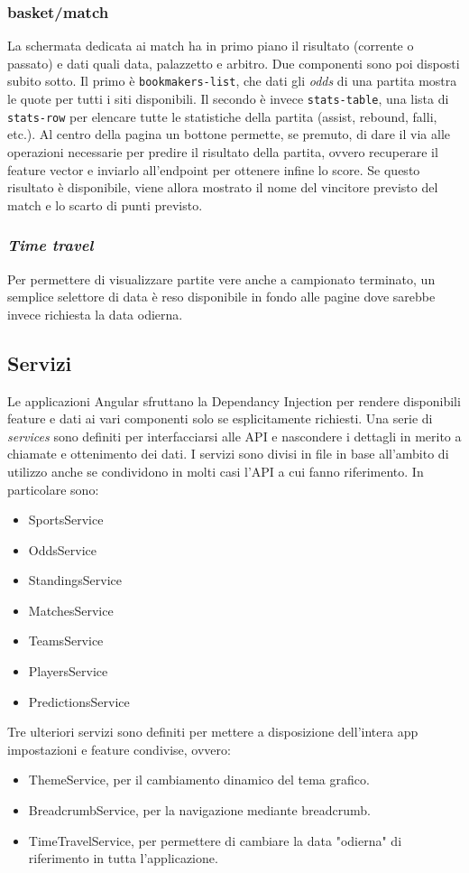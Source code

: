 \subsubsection{basket/match}
La schermata dedicata ai match ha in primo piano il risultato (corrente o passato) e dati quali data, palazzetto e arbitro. Due componenti sono poi disposti subito sotto. Il primo è \texttt{bookmakers-list}, che dati gli \textit{odds} di una partita mostra le quote per tutti i siti disponibili. Il secondo è invece \texttt{stats-table}, una lista di \texttt{stats-row} per elencare tutte le statistiche della partita (assist, rebound, falli, etc.).
Al centro della pagina un bottone permette, se premuto, di dare il via alle operazioni necessarie per predire il risultato della partita, ovvero recuperare il feature vector e inviarlo all'endpoint per ottenere infine lo score. Se questo risultato è disponibile, viene allora mostrato il nome del vincitore previsto del match e lo scarto di punti previsto. 

\subsubsection{\textit{Time travel}}
Per permettere di visualizzare partite vere anche a campionato terminato, un semplice selettore di data è reso disponibile in fondo alle pagine dove sarebbe invece richiesta la data odierna. 

\subsection{Servizi}
Le applicazioni Angular sfruttano la Dependancy Injection per rendere disponibili feature e dati ai vari componenti solo se esplicitamente richiesti. Una serie di \textit{services} sono definiti per interfacciarsi alle API e nascondere i dettagli in merito a chiamate e ottenimento dei dati.
I servizi sono divisi in file in base all'ambito di utilizzo anche se condividono in molti casi l'API a cui fanno riferimento. In particolare sono:
\begin{itemize}
    \item SportsService
    \item OddsService
    \item StandingsService
    \item MatchesService
    \item TeamsService
    \item PlayersService
    \item PredictionsService
\end{itemize}
Tre ulteriori servizi sono definiti per mettere a disposizione dell'intera app impostazioni e feature condivise, ovvero:
\begin{itemize}
    \item ThemeService, per il cambiamento dinamico del tema grafico.
    \item BreadcrumbService, per la navigazione mediante breadcrumb.
    \item TimeTravelService, per permettere di cambiare la data "odierna" di riferimento in tutta l'applicazione.
\end{itemize}

